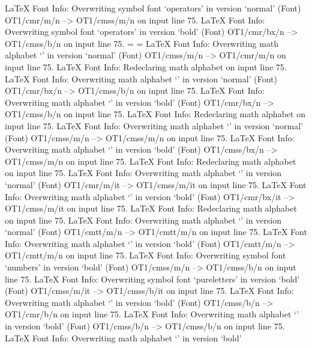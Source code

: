 LaTeX Font Info:    Overwriting symbol font `operators' in version `normal'
(Font)                  OT1/cmr/m/n --> OT1/cmss/m/n on input line 75.
LaTeX Font Info:    Overwriting symbol font `operators' in version `bold'
(Font)                  OT1/cmr/bx/n --> OT1/cmss/b/n on input line 75.
\symnumbers=
\sympureletters=
LaTeX Font Info:    Overwriting math alphabet `\mathrm' in version `normal'
(Font)                  OT1/cmss/m/n --> OT1/cmr/m/n on input line 75.
LaTeX Font Info:    Redeclaring math alphabet \mathbf on input line 75.
LaTeX Font Info:    Overwriting math alphabet `\mathbf' in version `normal'
(Font)                  OT1/cmr/bx/n --> OT1/cmss/b/n on input line 75.
LaTeX Font Info:    Overwriting math alphabet `\mathbf' in version `bold'
(Font)                  OT1/cmr/bx/n --> OT1/cmss/b/n on input line 75.
LaTeX Font Info:    Redeclaring math alphabet \mathsf on input line 75.
LaTeX Font Info:    Overwriting math alphabet `\mathsf' in version `normal'
(Font)                  OT1/cmss/m/n --> OT1/cmss/m/n on input line 75.
LaTeX Font Info:    Overwriting math alphabet `\mathsf' in version `bold'
(Font)                  OT1/cmss/bx/n --> OT1/cmss/m/n on input line 75.
LaTeX Font Info:    Redeclaring math alphabet \mathit on input line 75.
LaTeX Font Info:    Overwriting math alphabet `\mathit' in version `normal'
(Font)                  OT1/cmr/m/it --> OT1/cmss/m/it on input line 75.
LaTeX Font Info:    Overwriting math alphabet `\mathit' in version `bold'
(Font)                  OT1/cmr/bx/it --> OT1/cmss/m/it on input line 75.
LaTeX Font Info:    Redeclaring math alphabet \mathtt on input line 75.
LaTeX Font Info:    Overwriting math alphabet `\mathtt' in version `normal'
(Font)                  OT1/cmtt/m/n --> OT1/cmtt/m/n on input line 75.
LaTeX Font Info:    Overwriting math alphabet `\mathtt' in version `bold'
(Font)                  OT1/cmtt/m/n --> OT1/cmtt/m/n on input line 75.
LaTeX Font Info:    Overwriting symbol font `numbers' in version `bold'
(Font)                  OT1/cmss/m/n --> OT1/cmss/b/n on input line 75.
LaTeX Font Info:    Overwriting symbol font `pureletters' in version `bold'
(Font)                  OT1/cmss/m/it --> OT1/cmss/b/it on input line 75.
LaTeX Font Info:    Overwriting math alphabet `\mathrm' in version `bold'
(Font)                  OT1/cmss/b/n --> OT1/cmr/b/n on input line 75.
LaTeX Font Info:    Overwriting math alphabet `\mathbf' in version `bold'
(Font)                  OT1/cmss/b/n --> OT1/cmss/b/n on input line 75.
LaTeX Font Info:    Overwriting math alphabet `\mathsf' in version `bold'
